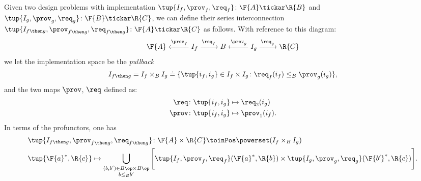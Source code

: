 \begin{definition}
\label{def:seriesdpi}
Given two design problems with implementation $\tup{I_f,\prov_f,\req_f}\colon \F{A}\tickar \R{B}$
and $\tup{I_g,\prov_g,\req_g}\colon \F{B}\tickar \R{C}$, we can define their
series interconnection $\tup{I_{f\then g},\prov_{f\then g},\req_{f\then g}}\colon \F{A}\tickar \R{C}$ as follows.
With reference to this diagram:
\begin{equation}
    \F{A} \xleftarrow{\prov_f} I_f \xrightarrow{\req_f} B
      \xleftarrow{\prov_g} I_g \xrightarrow{\req_g} \R{C}
\end{equation}
we let the implementation space be the \emph{pullback}
\begin{equation}
\begin{aligned}
I_{f\then g}&= I_f \times_B I_g \doteq \{
        \tup{i_f,i_g} \in I_f \times I_g \colon
        \req_f(i_f) \leq_{B} \prov_g(i_g)
    \},\\
\end{aligned}
\end{equation}
and the two maps $\prov$, $\req$ defined as:
\begin{equation}
\begin{aligned}
        \req  &\colon \tup{i_f,i_g} \mapsto \req_2(i_g)\\
        \prov  &\colon  \tup{i_f,i_g} \mapsto \prov_1(i_f).
\end{aligned}
\end{equation}
In terms of the profunctors, one has
\begin{equation}
\label{eq:seriesdpi}
\begin{aligned}
&\tup{I_{f\then g},\prov_{f\then g},\req_{f\then g}}\colon \F{A}\times \R{C} \toinPos \powerset(I_f \times_B I_g) \\
&\tup{\F{a}^*,\R{c}} \mapsto \bigcup_{\substack{(b,b') \in B\op \times B\op \\ b \leq_B b'}} \Bigg[ \tup{I_f,\prov_f,\req_f}(\F{a}^*,\R{b}) \times \tup{I_g,\prov_g,\req_g}(\F{b'}^*,\R{c}) \Bigg].
\end{aligned}
\end{equation}
\end{definition}

